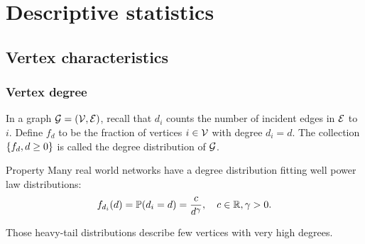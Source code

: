 \documentclass{beamer}\usepackage[]{graphicx}\usepackage[]{color}
\begin{document}
\section{Descriptive statistics}

\subsection{Vertex characteristics}

\begin{frame}
  \frametitle{Vertex degree}
  
  \begin{definition}
    In a graph $\mathcal{G} = (\mathcal{V}, \mathcal{E})$, recall that $d_i$ counts the number of incident edges in $\mathcal{E}$ to $i$. Define $f_d$ to be
    the fraction of vertices $i\in \mathcal{V}$ with degree $d_i=d$. The collection $\left\{f_d, d\geq 0\right\}$ is called the \alert{degree distribution} of $\mathcal{G}$.
  \end{definition}
  
  \begin{block}{Property}
    Many real world networks have a degree distribution fitting well power law distributions: 
    \[
      f_{d_i}(d) = \mathbb{P}(d_i = d) = \frac{c}{d^\gamma}, \quad c\in\mathbb{R}, \gamma > 0.
    \]
  \end{block}
  Those heavy-tail distributions describe few vertices with very high degrees.
\end{frame}
\end{document}
